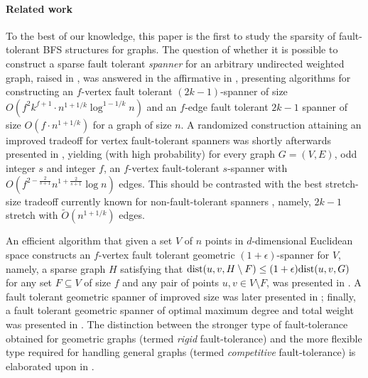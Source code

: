 \documentclass[12pt]{article}
\newcommand{\dist}{\mbox{\rm dist}}
\begin{document}
\paragraph{Related work}
To the best of our knowledge, this paper is the first to study
the sparsity of fault-tolerant BFS structures for graphs.
The question of whether it is possible to construct a sparse fault tolerant
\emph{spanner} for an arbitrary undirected weighted graph,
raised in \cite{CZ03},
was answered in the affirmative in \cite{CLPR09-span}, presenting algorithms
for constructing an $f$-vertex fault tolerant $(2k-1)$-spanner
of size $O(f^2 k^{f+1} \cdot n^{1+1/k}\log^{1-1/k}n)$ and an
$f$-edge fault tolerant $2k-1$ spanner of size $O(f\cdot n^{1+1/k})$
for a graph of size $n$.
A randomized construction attaining an improved tradeoff for vertex
fault-tolerant spanners was shortly afterwards presented in \cite{DK11},
yielding (with high probability) for every graph $G = (V,E)$,
odd integer $s$ and integer $f$, an $f$-vertex fault-tolerant $s$-spanner
with $O\left(f^{2-\frac{2}{s+1}}n^{1+\frac{2}{s+1}}\log{n}\right)$ edges.
This should be contrasted with the best stretch-size tradeoff currently
known for non-fault-tolerant spanners \cite{TZ01}, namely,
$2k-1$ stretch with ${\tilde O}(n^{1+1/k})$ edges.

An efficient algorithm that given a set $V$ of $n$ points
in $d$-dimensional Euclidean space constructs an $f$-vertex
fault tolerant geometric $(1+\epsilon)$-spanner for $V$, namely,
a sparse graph $H$ satisfying that
$\dist(u,v,H\setminus F) \leq (1+\epsilon) \dist(u,v,G)$ for any set
$F\subseteq V$ of size $f$ and any pair of points $u,v \in V\setminus F$,
was presented in \cite{LNS98}. A fault tolerant geometric spanner
of improved size was later presented in \cite{L99}; finally,
a fault tolerant geometric spanner of optimal maximum degree
and total weight was presented in \cite{CZ03}.
The distinction between the stronger type of fault-tolerance obtained
for geometric graphs (termed {\em rigid} fault-tolerance)
and the more flexible type required for handling general graphs
(termed {\em competitive} fault-tolerance) is elaborated upon in \cite{P09}.
\end{document}
